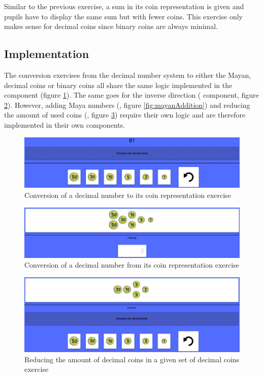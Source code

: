 Similar to the previous exercise, a sum in its coin representation is given and pupils have to display the same sum but with fewer coins. This exercise only makes sense for decimal coins since binary coins are always minimal.

\subsection{Implementation}

The conversion exercises from the decimal number system to either the Mayan, decimal coins or binary coins all share the same logic implemented in the  component (figure \ref{fig:coinsTo}).
The same goes for the inverse direction ( component, figure \ref{fig:coinsFrom}).
However, adding Maya numbers (, figure \ref{fig:mayanAddition}) and reducing the amount of used coins (, figure \ref{fig:coinsSwap}) require their own logic and are therefore implemented in their own components.

\begin{figure} 
  \centering
  \includegraphics[width=1.0 \columnwidth]{figures/coins_to.png}
  \caption{Conversion of a decimal number to its coin representation exercise} 
  \label{fig:coinsTo} 
\end{figure}

\begin{figure} 
  \centering
  \includegraphics[width=1.0 \columnwidth]{figures/coins_from.png}
  \caption{Conversion of a decimal number from its coin representation exercise} 
  \label{fig:coinsFrom} 
\end{figure}

\begin{figure} 
  \centering
  \includegraphics[width=1.0 \columnwidth]{figures/coins_swap.png}
  \caption{Reducing the amount of decimal coins in a given set of decimal coins exercise} 
  \label{fig:coinsSwap} 
\end{figure}

